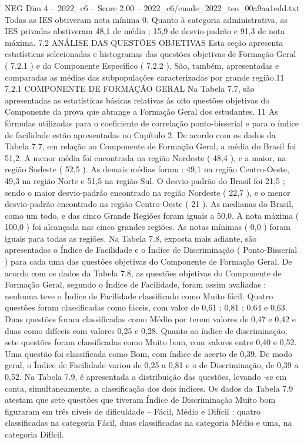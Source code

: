 \begin{textsample}{NEG Dim 4 – 2022\_c6 – Score 2.00 – 2022\_c6/enade\_2022\_teo\_00a9aa1edd.txt}
Todas as IES obtiveram nota mínima 0.
Quanto à categoria administrativa, as IES privadas abstiveram 48,1 de média ; 15,9 de desvio-padrão e 91,3 de nota máxima. 7.2 ANÁLISE DAS QUESTÕES OBJETIVAS Esta seção apresenta estatísticas selecionadas e histogramas das questões objetivas de Formação Geral ( 7.2.1 ) e do Componente Específico ( 7.2.2 ).
São, também, apresentadas e comparadas as médias das subpopulações caracterizadas por grande região.11 7.2.1 COMPONENTE DE FORMAÇÃO GERAL Na Tabela 7.7, são apresentadas as estatísticas básicas relativas às oito questões objetivas do Componente da prova que abrange a Formação Geral dos estudantes. 11 As fórmulas utilizadas para o coeficiente de correlação ponto-bisserial e para o índice de facilidade estão apresentadas no Capítulo 2.
De acordo com os dados da Tabela 7.7, em relação ao Componente de Formação Geral, a média do Brasil foi 51,2.
A menor média foi encontrada na região Nordeste ( 48,4 ), e a maior, na região Sudeste ( 52,5 ).
As demais médias foram : 49,1 na região Centro-Oeste, 49,3 na região Norte e 51,5 na região Sul.
O desvio-padrão do Brasil foi 21,5 ; sendo o maior desvio-padrão encontrado na região Nordeste ( 22,7 ), e o menor desvio-padrão encontrado na região Centro-Oeste ( 21 ).
As medianas do Brasil, como um todo, e das cinco Grande Regiões foram iguais a 50,0.
A nota máxima ( 100,0 ) foi alcançada nas cinco grandes regiões.
As notas mínimas ( 0,0 ) foram iguais para todas as regiões.
Na Tabela 7.8, exposta mais adiante, são apresentados o Índice de Facilidade e o Índice de Discriminação ( Ponto-Bisserial ) para cada uma das questões objetivas do Componente de Formação Geral.
De acordo com os dados da Tabela 7.8, as questões objetivas do Componente de Formação Geral, segundo o Índice de Facilidade, foram assim avaliadas : nenhuma teve o Índice de Facilidade classificado como Muito fácil.
Quatro questões foram classificadas como fáceis, com valor de 0,61 ; 0,81 ; 0,64 e 0,63.
Duas questões foram classificadas como Médio por terem valores de 0,47 e 0,42 e duas como difíceis com valores 0,25 e 0,28.
Quanto ao índice de discriminação, sete questões foram classificadas como Muito bom, com valores entre 0,40 e 0,52.
Uma questão foi classificada como Bom, com índice de acerto de 0,39.
De modo geral, o Índice de Facilidade variou de 0,25 a 0,81 e o de Discriminação, de 0,39 a 0,52.
Na Tabela 7.9, é apresentada a distribuição das questões, levando -se em conta, simultaneamente, a classificação dos dois índices.
Os dados da Tabela 7.9 atestam que sete questões que tiveram Índice de Discriminação Muito bom figuraram em três níveis de dificuldade – Fácil, Médio e Difícil : quatro classificadas na categoria Fácil, duas classificadas na categoria Médio e uma, na categoria Difícil.

\end{textsample}
